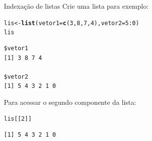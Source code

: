 \documentclass[10pt,handout]{beamer}\usepackage[]{graphicx}\usepackage[]{color}
\makeatletter
\newcommand{\hlnum}[1]{\textcolor[rgb]{0.686,0.059,0.569}{#1}}%
\newcommand{\hlopt}[1]{\textcolor[rgb]{0,0,0}{#1}}%
\newcommand{\hlstd}[1]{\textcolor[rgb]{0.345,0.345,0.345}{#1}}%
\newcommand{\hlkwb}[1]{\textcolor[rgb]{0.69,0.353,0.396}{#1}}%
\newcommand{\hlkwc}[1]{\textcolor[rgb]{0.333,0.667,0.333}{#1}}%
\newcommand{\hlkwd}[1]{\textcolor[rgb]{0.282,0.239,0.545}{\textbf{#1}}}%
\newenvironment{kframe}{%
 \def\at@end@of@kframe{}%
 \ifinner\ifhmode%
  \def\at@end@of@kframe{\end{minipage}}%
  \begin{minipage}{\columnwidth}%
 \fi\fi%
 \def\FrameCommand##1{\hskip\@totalleftmargin \hskip-\fboxsep
 \colorbox{shadecolor}{##1}\hskip-\fboxsep
     \hskip-\linewidth \hskip-\@totalleftmargin \hskip\columnwidth}%
 \MakeFramed {\advance\hsize-\width
   \@totalleftmargin\z@ \linewidth\hsize
   \@setminipage}}%
 {\par\unskip\endMakeFramed%
 \at@end@of@kframe}
\newenvironment{knitrout}{}{} %
\makeatother
\begin{document}
\begin{frame}[fragile]{Indexação de listas}
Crie uma lista para exemplo:
\begin{knitrout}\small
{}\color{fgcolor}\begin{kframe}
\begin{alltt}
\hlstd{lis} \hlkwb{<-} \hlkwd{list}\hlstd{(}\hlkwc{vetor1} \hlstd{=} \hlkwd{c}\hlstd{(}\hlnum{3}\hlstd{,} \hlnum{8}\hlstd{,} \hlnum{7}\hlstd{,} \hlnum{4}\hlstd{),} \hlkwc{vetor2} \hlstd{=} \hlnum{5}\hlopt{:}\hlnum{0}\hlstd{)}
\hlstd{lis}
\end{alltt}
\begin{verbatim}
$vetor1
[1] 3 8 7 4

$vetor2
[1] 5 4 3 2 1 0
\end{verbatim}
\end{kframe}
\end{knitrout}

Para acessar o segundo componente da lista:
\begin{knitrout}\small
{}\color{fgcolor}\begin{kframe}
\begin{alltt}
\hlstd{lis[[}\hlnum{2}\hlstd{]]}
\end{alltt}
\begin{verbatim}
[1] 5 4 3 2 1 0
\end{verbatim}
\end{kframe}
\end{knitrout}

\end{frame}
\end{document}
